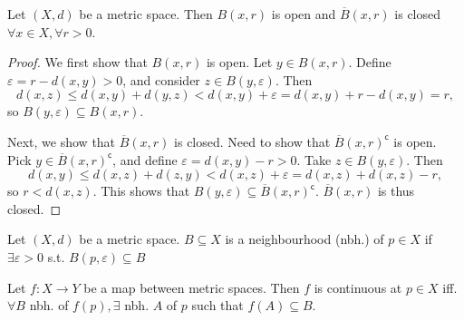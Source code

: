 \begin{proposition}
   Let \( (X, d) \) be a metric space.
   Then \( B(x, r) \) is open and \( \overline{B}(x, r) \)
   is closed \( \forall x \in X, \forall  r > 0 \).
\end{proposition}

\begin{proof}
   We first show that \( B(x, r) \) is open.
   Let \( y \in B(x, r) \). Define \( \varepsilon = r - d(x, y) > 0 \),
   and consider \( z \in B(y, \varepsilon) \).
   Then
   \[
    d(x, z) \le d(x, y) + d(y, z) < d(x, y) + \varepsilon = d(x, y) + r - d(x, y) = r,
   \]
   so \( B(y, \varepsilon) \subseteq B(x, r) \).

 Next, we show that \( \overline{B}(x, r) \) is closed.
 Need to show that \( \overline{B}(x, r)^{\mathsf{c}} \) is open.
 Pick \( y \in \overline{B}(x, r)^{\mathsf{c}} \), and define \( \varepsilon = d(x, y) - r > 0 \).
   Take \( z \in B(y, \varepsilon) \). Then
   \[
    d(x, y) \le d(x, z) + d(z, y) < d(x, z) + \varepsilon = d(x, z) + d(x, z) - r,
   \]
   so \( r < d(x, z) \). This shows that \( B(y, \varepsilon) \subseteq \overline{B}(x, r)^{\mathsf{c}} \).
  \( \overline{B}(x, r) \) is thus closed.
\end{proof}

\begin{definition}[Neighbourhood]
  Let \( (X, d) \) be a metric space.
  \( B \subseteq X \) is a 
  neighbourhood (nbh.) of \( p \in X \) if
  \( \exists \varepsilon > 0 \) s.t. \( B(p, \varepsilon) \subseteq B \)
\end{definition}

\begin{theorem}
  \label{thm:metric_spaces_cont_maps}
  Let \( f: X \to Y \) be a map between metric spaces.
  Then \( f \) is continuous at \( p \in X \) iff.
  \( \forall B \) nbh. of \( f(p), \exists \) nbh. \( A \)
  of \( p \) such that \( f(A) \subseteq B \).
\end{theorem}

